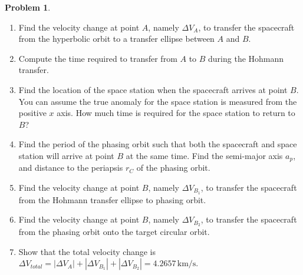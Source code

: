 \documentclass[10pt]{article}
\theoremstyle{definition}
\newtheorem{prob}{Problem}[section]
\newenvironment{subprob}%
{\renewcommand{\theenumi}{\alph{enumi}}\renewcommand{\labelenumi}{(\theenumi)}\begin{enumerate}}%
{\end{enumerate}}%
\begin{document}
\begin{prob}
\begin{subprob}
\item Find the velocity change at point $A$, namely $\Delta V_{A}$, to transfer the spacecraft from the hyperbolic orbit to a transfer ellipse between $A$ and $B$.
\item Compute the time required to transfer from $A$ to $B$ during the Hohmann transfer.
\item Find the location of the space station when the spacecraft arrives at point $B$.
    You can assume the true anomaly for the space station is measured from the positive \( x \) axis.
   How much time is required for the space station to  return to $B$?
\item Find the period of the phasing orbit such that both the spacecraft and space station will arrive at point \( B \) at the same time.
    Find the semi-major axis $a_p$, and distance to the periapsis $r_C$ of the phasing orbit.
\item Find the velocity change at point $B$, namely $\Delta V_{B_1}$, to transfer the spacecraft from the Hohmann transfer ellipse to phasing orbit.
\item Find the velocity change at point $B$, namely $\Delta V_{B_2}$, to transfer the spacecraft from the phasing orbit onto the target circular orbit.
\item Show that the total velocity change is $\Delta V_{total} = |\Delta V_A| + |\Delta V_{B_1}| +|\Delta V_{B_2}|=4.2657\,\mathrm{km/s}$.
\end{subprob}


\end{prob}



\end{document}
